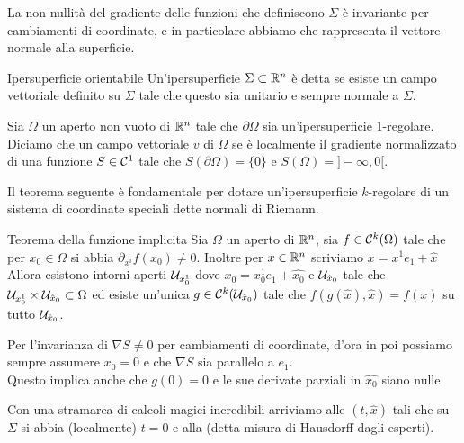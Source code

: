 \documentclass{book}
\begin{document}
\begin{remark}{}{}
    La non-nullità del gradiente delle funzioni che definiscono $\Sigma$ è invariante per cambiamenti di coordinate, e in particolare abbiamo che rappresenta il vettore normale alla superficie.
\end{remark}

\begin{definition}{Ipersuperficie orientabile}{}
    Un'ipersuperficie $\Sigma\subset\mathbb{R}^n$ è detta  se esiste un campo vettoriale definito su $\Sigma$ tale che questo sia unitario e sempre normale a $\Sigma$. 
\end{definition}

\begin{definition}{}{}
    Sia $\Omega$ un aperto non vuoto di $\mathbb{R}^n$ tale che $\partial\Omega$ sia un'ipersuperficie $1$-regolare.\\
    Diciamo che un campo vettoriale $v$  di $\Omega$ se è localmente il gradiente normalizzato di una funzione $S\in\mathcal{C}^1$  tale che $S(\partial\Omega) = \{0\}$ e $S(\Omega) = ]-\infty,0[$.
\end{definition}

Il teorema seguente è fondamentale per dotare un'ipersuperficie $k$-regolare di un sistema di coordinate speciali dette normali di Riemann.

\begin{theorem}{Teorema della funzione implicita}{}
    Sia $\Omega$ un aperto di $\mathbb{R}^n$, sia $f \in \mathcal{C}^k(\Omega)$ tale che per $x_0 \in \Omega$ si abbia $\partial_{x^i} f(x_0)\neq 0$. Inoltre per $x\in\mathbb{R}^n$ scriviamo $x = x^1e_1 + \hat{x}$\\
    Allora esistono intorni aperti $\mathcal{U}_{x_0^1}$ dove $x_0 = x_0^1 e_1 + \hat{x_0}$ e $\mathcal{U}_{\hat{x}_0}$ tale che $\mathcal{U}_{x_0^1}\times\mathcal{U}_{\hat{x}_0}\subset\Omega $ ed esiste un'unica $g\in\mathcal{C}^k(\mathcal{U}_{\hat{x}_0})$ tale che $f(g(\hat{x}),\hat{x}) = f(x)$ su tutto $\mathcal{U}_{\hat{x}_0}$.
\end{theorem}

\begin{remark}{}{}
    Per l'invarianza di $\nabla S \neq 0$ per cambiamenti di coordinate, d'ora in poi possiamo sempre assumere $x_0 = 0$ e che $\nabla S$ sia parallelo a $e_1$.\\
    Questo implica anche che $g(0)=0$ e le sue derivate parziali in $\hat{x_0}$ siano nulle
\end{remark}

Con una stramarea di calcoli magici incredibili arriviamo alle  $(t,\hat{x})$ tali che su $\Sigma$ si abbia (localmente) $t=0$ e alla  (detta misura di Hausdorff dagli esperti). 
\end{document}
